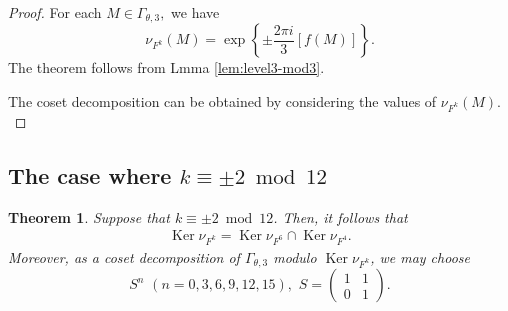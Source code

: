 \documentclass[12pt]{article}
\theoremstyle{definition}
\newtheorem{theorem}{Theorem}
\numberwithin{equation}{section}
\numberwithin{theorem}{section}
\newcommand{\Ker}{\operatorname{Ker}}
\begin{document}
\begin{proof}
For each $M\in\Gamma_{\theta,3},$ 
we have 
\begin{equation*}
\nu_{F^k}(M)
=
\exp
\left\{
\pm
\frac{2\pi i}{3}
\left[
f(M)
\right]
\right\}. 
\end{equation*}
The theorem follows from Lmma \ref{lem:level3-mod3}.  
\par
The coset decomposition can be obtained by considering the values of $\nu_{F^{k}  }(M).$
\end{proof}





















\subsection{The case where $k\equiv \pm 2 \bmod{12}$}



\begin{theorem}
\label{thmk=2-level3}
{\it
Suppose that 
$k\equiv \pm2 \bmod{12}$. 
Then, it follows that 
\begin{align*}
\Ker \nu_{F^{k}}
=
\Ker 
\nu_{ F^{6} }
\cap
\Ker \nu_{ F^4 }. 
\end{align*}
Moreover, 
as a coset decomposition of $\Gamma_{\theta,3}$ modulo $\Ker \nu_{F^{k}}$,  
we may choose 
\begin{equation*}
S^{n}  \,\, 
(n=0,3,6,9,12,15),  \,\,
S=
\begin{pmatrix}
1 & 1 \\
0 & 1
\end{pmatrix}. 
\end{equation*}
}
\end{theorem}
\end{document}
